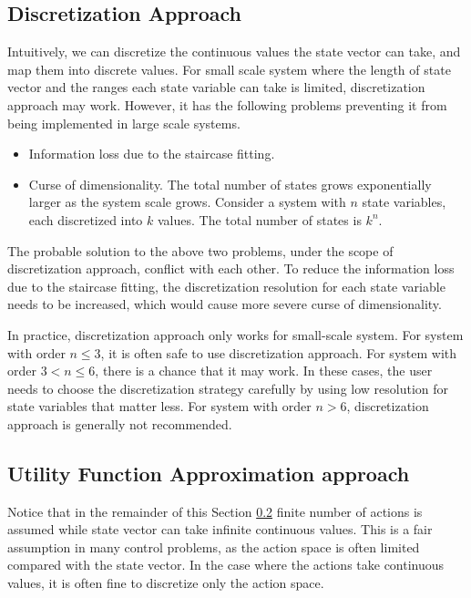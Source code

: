 \subsection{Discretization Approach}

Intuitively, we can discretize the continuous values the state vector can take, and map them into discrete values. For small scale system where the length of state vector and the ranges each state variable can take is limited, discretization approach may work. However, it has the following problems preventing it from being implemented in large scale systems.
\begin{itemize}
	\item Information loss due to the staircase fitting.
	\item Curse of dimensionality. The total number of states grows exponentially larger as the system scale grows. Consider a system with $n$ state variables, each discretized into $k$ values. The total number of states is $k^n$.
\end{itemize}
The probable solution to the above two problems, under the scope of discretization approach, conflict with each other. To reduce the information loss due to the staircase fitting, the discretization resolution for each state variable needs to be increased, which would cause more severe curse of dimensionality.

In practice, discretization approach only works for small-scale system. For system with order $n\leq 3$, it is often safe to use discretization approach. For system with order $3 < n\leq 6$, there is a chance that it may work. In these cases, the user needs to choose the discretization strategy carefully by using low resolution for state variables that matter less. For system with order $n>6$, discretization approach is generally not recommended.

\subsection{Utility Function Approximation approach} \label{sec:vfapproximation}

Notice that in the remainder of this Section \ref{sec:vfapproximation} finite number of actions is assumed while state vector can take infinite continuous values. This is a fair assumption in many control problems, as the action space is often limited compared with the state vector. In the case where the actions take continuous values, it is often fine to discretize only the action space.

